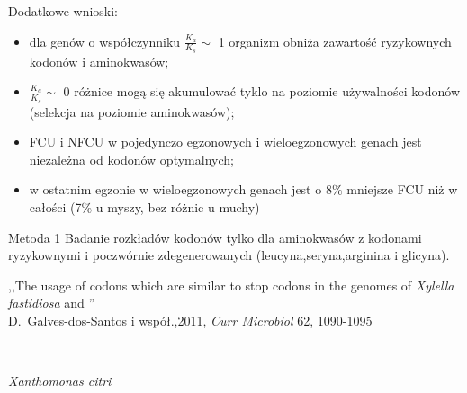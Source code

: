 \documentclass[compress,clock,xcolor=dvipsnames,hyperref={pdfpagelabels=false},final]{beamer}
\begin{document}
\begin{frame}{Dodatkowe wnioski:}
\pause \begin{itemize}
        \item dla genów o współczynniku $\frac{K_{a}}{K_{s}} \sim$  1 organizm obniża
zawartość ryzykownych kodonów i aminokwasów;
\pause \item  $\frac{K_{a}}{K_{s}} \sim$ 0 różnice mogą się akumulować tyklo na poziomie używalności kodonów (selekcja na poziomie aminokwasów);
\pause \item FCU i NFCU w pojedynczo egzonowych i wieloegzonowych genach jest niezależna od kodonów optymalnych;
\pause \item w ostatnim egzonie w wieloegzonowych genach jest o 8$\%$ mniejsze FCU niż w całości (7$\%$ u myszy, bez różnic u muchy) 
       \end{itemize}
\end{frame}

\begin{frame}
\begin{block}{Metoda 1}
Badanie rozkładów kodonów tylko dla aminokwasów z kodonami ryzykownymi i poczwórnie zdegenerowanych
(leucyna,seryna,arginina i glicyna).
\end{block}
\tiny{
 ,,The usage of codons which are similar to stop codons in the genomes of {\it Xylella fastidiosa} and 
''\\
D.~Galves-dos-Santos i współ.,2011, {\it  Curr Microbiol} 62, 1090-1095
}
\end{frame}

\begin{frame}
\begin{center}
\\
\end{center}
\end{frame}{\it Xanthomonas citri}
\end{document}
